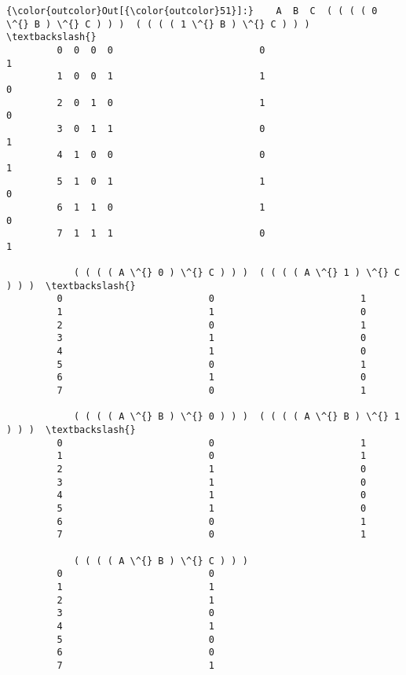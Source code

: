 \documentclass[11pt]{article}
\begin{document}
\begin{Verbatim}[commandchars=\\\{\}]
{\color{outcolor}Out[{\color{outcolor}51}]:}    A  B  C  ( ( ( ( 0 \^{} B ) \^{} C ) ) )  ( ( ( ( 1 \^{} B ) \^{} C ) ) )  \textbackslash{}
         0  0  0  0                          0                          1   
         1  0  0  1                          1                          0   
         2  0  1  0                          1                          0   
         3  0  1  1                          0                          1   
         4  1  0  0                          0                          1   
         5  1  0  1                          1                          0   
         6  1  1  0                          1                          0   
         7  1  1  1                          0                          1   
         
            ( ( ( ( A \^{} 0 ) \^{} C ) ) )  ( ( ( ( A \^{} 1 ) \^{} C ) ) )  \textbackslash{}
         0                          0                          1   
         1                          1                          0   
         2                          0                          1   
         3                          1                          0   
         4                          1                          0   
         5                          0                          1   
         6                          1                          0   
         7                          0                          1   
         
            ( ( ( ( A \^{} B ) \^{} 0 ) ) )  ( ( ( ( A \^{} B ) \^{} 1 ) ) )  \textbackslash{}
         0                          0                          1   
         1                          0                          1   
         2                          1                          0   
         3                          1                          0   
         4                          1                          0   
         5                          1                          0   
         6                          0                          1   
         7                          0                          1   
         
            ( ( ( ( A \^{} B ) \^{} C ) ) )  
         0                          0  
         1                          1  
         2                          1  
         3                          0  
         4                          1  
         5                          0  
         6                          0  
         7                          1  
\end{Verbatim}
            
\end{document}

